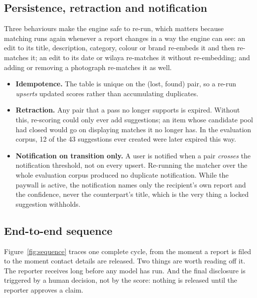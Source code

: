\subsection{Persistence, retraction and notification}

Three behaviours make the engine safe to re-run, which matters because matching
runs again whenever a report changes in a way the engine can see: an edit to its
title, description, category, colour or brand re-embeds it and then re-matches
it; an
edit to its date or wilaya re-matches it without re-embedding; and adding or
removing a photograph re-matches it as well.

\begin{itemize}[leftmargin=1.4em,itemsep=3pt]
  \item \textbf{Idempotence.} The  table is unique on the (lost,
        found) pair, so a re-run \emph{upserts} updated scores rather than
        accumulating duplicates.
  \item \textbf{Retraction.} Any pair that a pass no longer supports is expired.
        Without this, re-scoring could only ever add suggestions; an item whose
        candidate pool had closed would go on displaying matches it no longer
        has. In the evaluation corpus, 12 of the 43 suggestions ever created
        were later expired this way.
  \item \textbf{Notification on transition only.} A user is notified when a pair
        \emph{crosses} the notification threshold, not on every upsert.
        Re-running the matcher over the whole evaluation corpus produced no
        duplicate notification. While the paywall is active, the notification
        names only the recipient's own report and the confidence, never the
        counterpart's title, which is the very thing a locked suggestion
        withholds.
\end{itemize}

\subsection{End-to-end sequence}

Figure~\ref{fig:sequence} traces one complete cycle, from the moment a report is
filed to the moment contact details are released. Two things are worth reading
off it. The reporter receives  long before any model has run.
And the final disclosure is triggered by a human decision, not by the score:
nothing is released until the reporter approves a claim.

